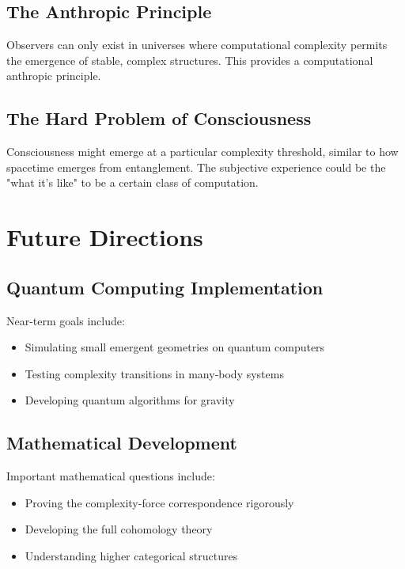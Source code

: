 \documentclass[12pt,a4paper]{article}
\begin{document}
\subsection{The Anthropic Principle}

Observers can only exist in universes where computational complexity permits the emergence of stable, complex structures. This provides a computational anthropic principle.

\subsection{The Hard Problem of Consciousness}

Consciousness might emerge at a particular complexity threshold, similar to how spacetime emerges from entanglement. The subjective experience could be the "what it's like" to be a certain class of computation.

\section{Future Directions}

\subsection{Quantum Computing Implementation}

Near-term goals include:
\begin{itemize}
\item Simulating small emergent geometries on quantum computers
\item Testing complexity transitions in many-body systems
\item Developing quantum algorithms for gravity
\end{itemize}

\subsection{Mathematical Development}

Important mathematical questions include:
\begin{itemize}
\item Proving the complexity-force correspondence rigorously
\item Developing the full cohomology theory
\item Understanding higher categorical structures
\end{itemize}
\end{document}
